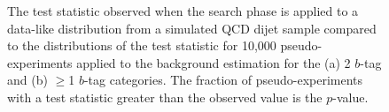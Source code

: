 \begin{figure}[!ht]
  \begin{center}
    \captionsetup[subfigure]{aboveskip=0pt,justification=centering}
  \end{center}
  \caption{The \bh{} test statistic observed when the search phase is applied to a data-like distribution from a simulated QCD dijet sample
    compared to the distributions of the \bh{} test statistic for 10,000 pseudo-experiments applied to the background estimation for
    the (a) 2 $b$-tag and (b) $\geq$1 $b$-tag categories.
    The fraction of pseudo-experiments with a \bh{} test statistic greater than the observed value is the \bh{} \mbox{$p$-value}.}
  \label{fig:DataLikeStatPlots_bh}
\end{figure}


